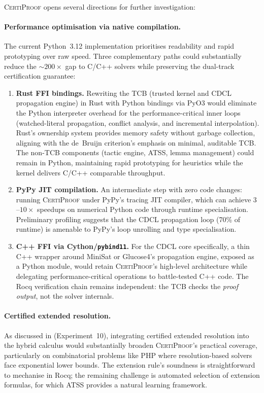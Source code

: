 \documentclass[acmtocl,review,anonymous]{acmart}
\newcommand{\CP}{\textsc{CertiProof}}
\begin{document}
\CP{} opens several directions for further investigation:

\paragraph{Performance optimisation via native compilation.}
The current Python~3.12 implementation prioritises readability and
rapid prototyping over raw speed.  Three complementary paths could
substantially reduce the $\sim 200\times$ gap to C/C++ solvers while
preserving the dual-track certification guarantee:
\begin{enumerate}
  \item \textbf{Rust FFI bindings.} Rewriting the TCB (trusted kernel
    and CDCL propagation engine) in Rust with Python bindings via
    PyO3 would eliminate the Python interpreter overhead for the
    performance-critical inner loops (watched-literal propagation,
    conflict analysis, and incremental interpolation).  Rust's
    ownership system provides memory safety without garbage
    collection, aligning with the de~Bruijn criterion's emphasis on
    minimal, auditable TCB.  The non-TCB components (tactic engine,
    ATSS, lemma management) could remain in Python, maintaining
    rapid prototyping for heuristics while the kernel delivers C/C++
    comparable throughput.

  \item \textbf{PyPy JIT compilation.} An intermediate step with zero
    code changes: running \CP{} under PyPy's tracing JIT compiler,
    which can achieve $3$--$10\times$ speedups on numerical Python
    code through runtime specialisation.  Preliminary profiling
    suggests that the CDCL propagation loop (70\% of runtime) is
    amenable to PyPy's loop unrolling and type specialisation.

  \item \textbf{C++ FFI via Cython/\texttt{pybind11}.}  For the CDCL
    core specifically, a thin C++ wrapper around MiniSat or Glucose4's
    propagation engine, exposed as a Python module, would retain
    \CP{}'s high-level architecture while delegating
    performance-critical operations to battle-tested C++ code.
    The Rocq verification chain remains independent: the TCB checks
    the \emph{proof output}, not the solver internals.
\end{enumerate}

\paragraph{Certified extended resolution.}
As discussed in  (Experiment~10), integrating
certified extended resolution into the hybrid calculus would
substantially broaden \CP{}'s practical coverage, particularly on
combinatorial problems like PHP where resolution-based solvers face
exponential lower bounds.  The extension rule's soundness is
straightforward to mechanise in Rocq; the remaining challenge is
automated selection of extension formulas, for which ATSS provides a
natural learning framework.
\end{document}
